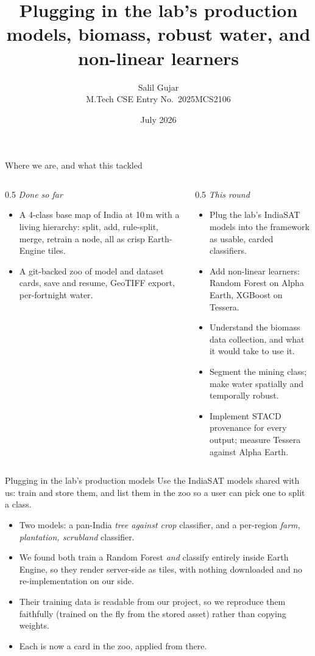 \documentclass[aspectratio=169]{beamer}
\title[IndiaSAT models, biomass, robust water]{Plugging in the lab's production models, biomass, robust water, and non-linear learners}
\author[Salil Gujar]{Salil Gujar \\ \footnotesize M.Tech CSE \quad Entry No.\ 2025MCS2106}
\date{July 2026}
\begin{document}
\frame{\titlepage}

\begin{frame}{Where we are, and what this tackled}
\begin{columns}[T]
\begin{column}{0.5\textwidth}
\emph{Done so far}
\begin{itemize}\small
  \item A 4-class base map of India at 10\,m with a living hierarchy: split, add, rule-split, merge,
  retrain a node, all as crisp Earth-Engine tiles.
  \item A git-backed zoo of model and dataset cards, save and resume, GeoTIFF export, per-fortnight
  water.
\end{itemize}
\end{column}
\begin{column}{0.5\textwidth}
\emph{This round}
\begin{itemize}\small
  \item Plug the lab's IndiaSAT models into the framework as usable, carded classifiers.
  \item Add non-linear learners: Random Forest on Alpha Earth, XGBoost on Tessera.
  \item Understand the biomass data collection, and what it would take to use it.
  \item Segment the mining class; make water spatially and temporally robust.
  \item Implement STACD provenance for every output; measure Tessera against Alpha Earth.
\end{itemize}
\end{column}
\end{columns}
\end{frame}

\begin{frame}{Plugging in the lab's production models}
Use the IndiaSAT models shared with us: train and store them, and list them in the zoo so a user can
pick one to split a class.
\begin{itemize}\small
  \item Two models: a pan-India \emph{tree against crop} classifier, and a per-region \emph{farm,
  plantation, scrubland} classifier.
  \item We found both train a Random Forest \emph{and} classify entirely inside Earth Engine, so they
  render server-side as tiles, with nothing downloaded and no re-implementation on our side.
  \item Their training data is readable from our project, so we reproduce them faithfully (trained on
  the fly from the stored asset) rather than copying weights.
  \item Each is now a card in the zoo, applied from there.
\end{itemize}
\end{frame}
\end{document}
